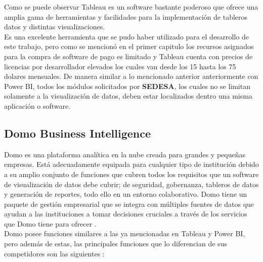 Como se puede observar Tableau es un software bastante poderoso que ofrece una amplia gama de herramientas y facilidades para la implementación de tableros datos y distintas visualizaciones.\\
Es una excelente herramienta que se pudo haber utilizado para el desarrollo de este trabajo, pero como se mencionó en el primer capitulo los recursos asignados para la compra de software de pago es limitado y Tableau cuenta con precios de licencias por desarrollador elevados los cuales van desde los 15 hasta los 75 dolares mensuales. De manera similar a lo mencionado anterior anteriormente con Power BI, todos los módulos solicitados por \textbf{SEDESA}, los cuales no se limitan solamente a la visualización de datos, deben estar localizados dentro una misma aplicación o software.

\subsection{Domo Business Intelligence}
Domo es una plataforma analítica en la nube creada para grandes y pequeñas empresas. Está adecuadamente equipada para cualquier tipo de institución debido a su amplio conjunto de funciones que cubren todos los requisitos que un software de visualización de datos debe cubrir; de seguridad, gobernanza, tableros de datos y generación de reportes, todo ello en un entorno colaborativo. Domo tiene un paquete de gestión empresarial que se integra con múltiples fuentes de datos que ayudan a las instituciones a tomar decisiones cruciales a través de los servicios que Domo tiene para ofrecer \cite{robb2022domo}.\\

Domo posee funciones similares a las ya mencionadas en Tableau y Power BI, pero además de estas, las principales funciones que lo diferencian de sus competidores son las siguientes \cite{graphable_domo_analytics}:

